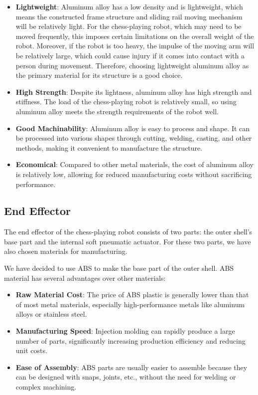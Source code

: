 \documentclass[10pt, a4paper, twocolumn]{article}
\begin{document}
\begin{itemize}
    \item \textbf{Lightweight}: Aluminum alloy has a low density and is lightweight, which means the constructed frame structure and sliding rail moving mechanism will be relatively light. For the chess-playing robot, which may need to be moved frequently, this imposes certain limitations on the overall weight of the robot. Moreover, if the robot is too heavy, the impulse of the moving arm will be relatively large, which could cause injury if it comes into contact with a person during movement. Therefore, choosing lightweight aluminum alloy as the primary material for its structure is a good choice.
    \item \textbf{High Strength}: Despite its lightness, aluminum alloy has high strength and stiffness. The load of the chess-playing robot is relatively small, so using aluminum alloy meets the strength requirements of the robot well.
    \item \textbf{Good Machinability}: Aluminum alloy is easy to process and shape. It can be processed into various shapes through cutting, welding, casting, and other methods, making it convenient to manufacture the structure.
    \item \textbf{Economical}: Compared to other metal materials, the cost of aluminum alloy is relatively low, allowing for reduced manufacturing costs without sacrificing performance.
\end{itemize}

\subsection{End Effector}
The end effector of the chess-playing robot consists of two parts: the outer shell's base part and the internal soft pneumatic actuator. For these two parts, we have also chosen materials for manufacturing.

We have decided to use ABS to make the base part of the outer shell. ABS material has several advantages over other materials:
\begin{itemize}
    \item \textbf{Raw Material Cost}: The price of ABS plastic is generally lower than that of most metal materials, especially high-performance metals like aluminum alloys or stainless steel.
    \item \textbf{Manufacturing Speed}: Injection molding can rapidly produce a large number of parts, significantly increasing production efficiency and reducing unit costs.
    \item \textbf{Ease of Assembly}: ABS parts are usually easier to assemble because they can be designed with snaps, joints, etc., without the need for welding or complex machining.
\end{itemize}
\end{document}
